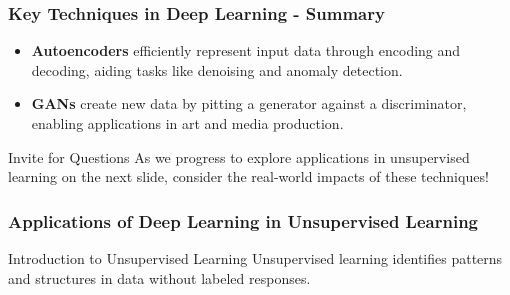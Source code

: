 \documentclass[aspectratio=169]{beamer}
\begin{document}
\begin{frame}[fragile]
    \frametitle{Key Techniques in Deep Learning - Summary}
    \begin{itemize}
        \item \textbf{Autoencoders} efficiently represent input data through encoding and decoding, aiding tasks like denoising and anomaly detection.
        \item \textbf{GANs} create new data by pitting a generator against a discriminator, enabling applications in art and media production.
    \end{itemize}

    \begin{block}{Invite for Questions}
        As we progress to explore applications in unsupervised learning on the next slide, consider the real-world impacts of these techniques!
    \end{block}
\end{frame}

\begin{frame}[fragile]
    \frametitle{Applications of Deep Learning in Unsupervised Learning}
    \begin{block}{Introduction to Unsupervised Learning}
        Unsupervised learning identifies patterns and structures in data without labeled responses.
    \end{block}
\end{frame}
\end{document}
